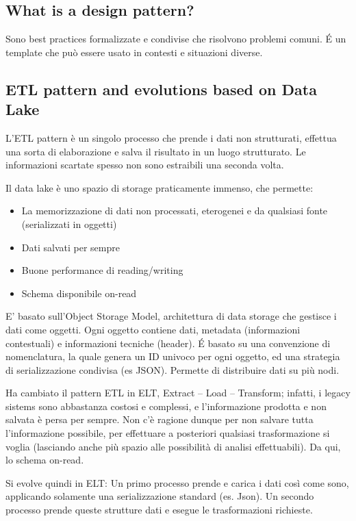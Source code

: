 \documentclass{article}
\begin{document}
\subsection{What is a design pattern?}
Sono best practices formalizzate e condivise che risolvono problemi comuni. É un template che può essere usato in contesti e situazioni diverse.

\subsection{ETL pattern and evolutions based on Data Lake}
L'ETL pattern è un singolo processo che prende i dati non strutturati, effettua una sorta di elaborazione e salva il risultato in un luogo strutturato. Le informazioni scartate spesso non sono estraibili una seconda volta.

Il data lake è uno spazio di storage praticamente immenso, che permette:
\begin{itemize}
\item La memorizzazione di dati non processati, eterogenei e da qualsiasi fonte (serializzati in oggetti)
\item Dati salvati per sempre
\item Buone performance di reading/writing
\item Schema disponibile on-read
\end{itemize}

E’ basato sull'Object Storage Model, architettura di data storage che gestisce i dati come oggetti. Ogni oggetto contiene dati, metadata (informazioni contestuali) e informazioni tecniche (header).
É basato su una convenzione di nomenclatura, la quale genera un ID univoco per ogni oggetto, ed una strategia di serializzazione condivisa (es JSON). Permette di distribuire dati su più nodi.

Ha cambiato il pattern ETL in ELT, Extract – Load – Transform; infatti, i legacy sistems sono abbastanza costosi e complessi, e l’informazione prodotta e non salvata è persa per sempre. Non c'è ragione dunque per non salvare tutta l’informazione possibile, per effettuare a posteriori qualsiasi trasformazione si voglia (lasciando anche più spazio alle possibilità di analisi effettuabili). Da qui, lo schema on-read.

Si evolve quindi in ELT: Un primo processo prende e carica i dati così come sono, applicando solamente una serializzazione standard (es. Json). Un secondo processo prende queste strutture dati e esegue le trasformazioni richieste.
\end{document}
